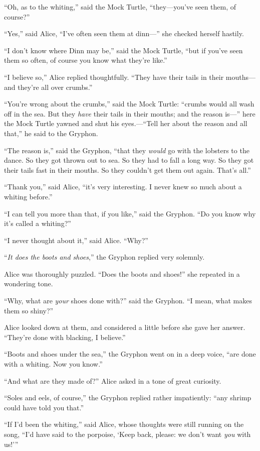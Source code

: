 \documentclass[11pt,openany,oneside]{book}
\begin{document}
“Oh, as to the whiting,” said the Mock Turtle, “they—you’ve seen them, of course?” 

“Yes,” said Alice, “I’ve often seen them at dinn—” she checked herself hastily. 

“I don’t know where Dinn may be,” said the Mock Turtle, “but if you’ve seen them so often, of course you know what they’re like.” 

“I believe so,” Alice replied thoughtfully. “They have their tails in their mouths—and they’re all over crumbs.” 

“You’re wrong about the crumbs,” said the Mock Turtle: “crumbs would all wash off in the sea. But they {\em have\/} their tails in their mouths; and the reason is—” here the Mock Turtle yawned and shut his eyes.—“Tell her about the reason and all that,” he said to the Gryphon. 

“The reason is,” said the Gryphon, “that they {\em would\/} go with the lobsters to the dance. So they got thrown out to sea. So they had to fall a long way. So they got their tails fast in their mouths. So they couldn’t get them out again. That’s all.” 

“Thank you,” said Alice, “it’s very interesting. I never knew so much about a whiting before.” 

“I can tell you more than that, if you like,” said the Gryphon. “Do you know why it’s called a whiting?” 

“I never thought about it,” said Alice. “Why?” 

“{\em It does the boots and shoes\/},” the Gryphon replied very solemnly. 

Alice was thoroughly puzzled. “Does the boots and shoes!” she repeated in a wondering tone. 

“Why, what are {\em your\/} shoes done with?” said the Gryphon. “I mean, what makes them so shiny?” 

Alice looked down at them, and considered a little before she gave her answer. “They’re done with blacking, I believe.” 

“Boots and shoes under the sea,” the Gryphon went on in a deep voice, “are done with a whiting. Now you know.” 

“And what are they made of?” Alice asked in a tone of great curiosity. 

“Soles and eels, of course,” the Gryphon replied rather impatiently: “any shrimp could have told you that.” 

“If I’d been the whiting,” said Alice, whose thoughts were still running on the song, “I’d have said to the porpoise, ‘Keep back, please: we don’t want {\em you\/} with us!’” 
\end{document}
